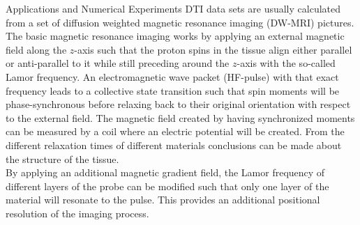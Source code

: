 \begin{chapter}{Applications and Numerical Experiments}
DTI data sets are usually calculated from a set of diffusion weighted magnetic resonance imaging (DW-MRI) pictures. The basic magnetic resonance imaging works by applying an external magnetic field along
the $z$-axis such that the proton spins in the tissue align either parallel or anti-parallel to it while still preceding around the $z$-axis with the so-called Lamor frequency.
An electromagnetic wave packet (HF-pulse) with that exact frequency leads to a collective state transition such that spin moments will be phase-synchronous before relaxing
back to their original orientation with respect to the external field. The magnetic field created by having synchronized moments can be measured by a coil where an electric potential will be created.
From the different relaxation times of different materials conclusions can be made about the structure of the tissue.\\

By applying an additional magnetic gradient field, the Lamor frequency of different layers of the probe can be modified such that only one layer of the material will resonate to the pulse.
This provides an additional positional resolution of the imaging process.\\


\end{chapter}
